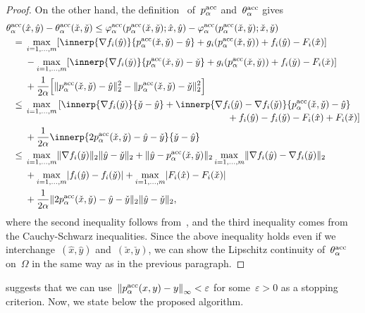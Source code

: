 \documentclass[../main]{subfiles}
\begin{document}
\begin{proof}
    On the other hand, the definition~ of~$p^\acc_\alpha$ and~$\theta^\acc_\alpha$ gives
    \begin{align}
        \MoveEqLeft \theta^\acc_\alpha(\hat{x}, \hat{y}) - \theta^\acc_\alpha(\check{x}, \check{y}) \le \varphi^\acc_\alpha(p^\acc_\alpha(\check{x}, \check{y}); \hat{x}, \hat{y}) - \varphi^\acc_\alpha(p^\acc_\alpha(\check{x}, \check{y}); \check{x}, \check{y})  \\
        ={} & \max_{i = 1, \dots, m} [\innerp{\nabla f_i(\hat{y})}{p^\acc_\alpha(\check{x}, \check{y}) - \hat{y}} + g_i(p^\acc_\alpha(\check{x}, \check{y})) + f_i(\hat{y}) - F_i(\hat{x})] \\
            &- \max_{i = 1, \dots, m} [\innerp{\nabla f_i(\check{y})}{p^\acc_\alpha(\check{x}, \check{y}) - \check{y}} + g_i(p^\acc_\alpha(\check{x}, \check{y})) + f_i(\check{y}) - F_i(\check{x})] \\
           &+ \frac{1}{2 \alpha} \Big[ \norm{p^\acc_\alpha(\check{x}, \check{y}) - \hat{y}}_2^2 - \norm{p^\acc_\alpha(\check{x}, \check{y}) - \check{y}}_2^2 \Big] \\
       \le{} & \max_{i = 1, \dots, m} 
       \begin{multlined}[t]
           [ \innerp{\nabla f_i(\check{y})}{\check{y} - \hat{y}} + \innerp{\nabla f_i(\hat{y}) - \nabla f_i(\check{y})}{p^\acc_\alpha(\check{x}, \check{y}) - \hat{y}} \\
           + f_i(\hat{y}) - f_i(\check{y}) - F_i(\hat{x}) + F_i(\check{x}) ]
       \end{multlined} \\
             &+ \frac{1}{2 \alpha} \innerp{2 p^\acc_\alpha(\check{x}, \check{y}) - \hat{y} - \check{y}}{\check{y} - \hat{y}} \\
       \le{} & \max_{i = 1, \dots, m} \norm{\nabla f_i(\check{y})}_2 \norm{\hat{y} - \check{y}}_2 + \norm{\hat{y} - p^\acc_\alpha(\check{x}, \check{y})}_2 \max_{i = 1, \dots, m} \norm{\nabla f_i(\hat{y}) - \nabla f_i(\check{y})}_2 \\
             &+ \max_{i = 1, \dots, m} \abs{f_i(\hat{y}) - f_i(\check{y})} + \max_{i = 1, \dots, m} \abs{F_i(\hat{x}) - F_i(\check{x})} \\
             &+ \frac{1}{2 \alpha} \norm{2 p^\acc_\alpha(\check{x}, \check{y}) - \hat{y} - \check{y}}_2 \norm{\hat{y} - \check{y}}_2
   ,\end{align}
   where the second inequality follows from~, and the third inequality comes from the Cauchy-Schwarz inequalities.
   Since the above inequality holds even if we interchange~$(\hat{x}, \hat{y})$ and~$(\check{x}, \check{y})$, we can show the Lipschitz continuity of~$\theta^\acc_\alpha$ on~$\Omega$ in the same way as in the previous paragraph.
     \end{proof}
      suggests that we can use~$\norm*{p^\acc_\alpha(x, y) - y}_\infty < \varepsilon$ for some~$\varepsilon > 0$ as a stopping criterion.
Now, we state below the proposed algorithm.
\end{document}
